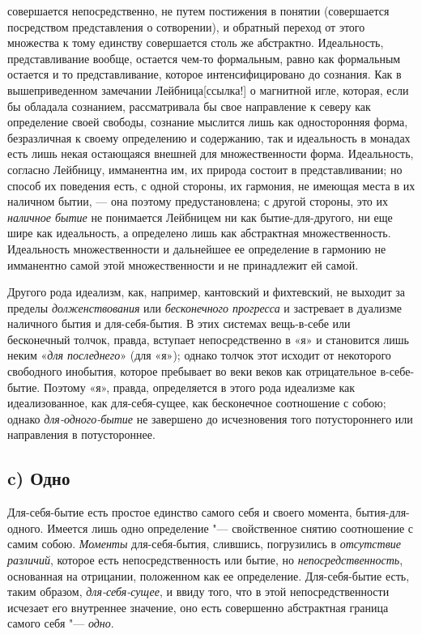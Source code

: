 совершается непосредственно, не путем постижения в понятии (совершается
посредством представления о сотворении), и обратный переход от этого
множества к тому единству совершается столь же абстрактно. Идеальность,
представливание вообще, остается чем-то формальным, равно как формальным
остается и то представливание, которое интенсифицировано до сознания. Как в
вышеприведенном замечании
Лейбница[ссылка!] о магнитной игле, которая, если
бы обладала сознанием, рассматривала бы свое направление к северу как
определение своей свободы, сознание мыслится лишь как односторонняя форма,
безразличная к своему определению и содержанию, так и идеальность в монадах
есть лишь некая остающаяся внешней для множественности форма. Идеальность,
согласно Лейбницу, имманентна им, их природа состоит в представливании; но
способ их поведения есть, с одной стороны, их гармония, не имеющая места в
их наличном бытии, — она поэтому предустановлена; с другой стороны, это их
{\em наличное бытие} не понимается Лейбницем ни как
бытие-для-другого, ни еще шире как идеальность, а определено лишь как
абстрактная множественность. Идеальность множественности и дальнейшее ее
определение в гармонию не имманентно самой этой множественности и не
принадлежит ей самой.

Другого рода идеализм, как, например, кантовский и фихтевский, не выходит за
пределы {\em долженствования} или
{\em бесконечного прогресса} и застревает в дуализме
наличного бытия и для-себя-бытия. В этих системах вещь-в-себе или
бесконечный толчок, правда, вступает непосредственно в «я» и становится
лишь неким «{\em для последнего}» (для «я»); однако
толчок этот исходит от некоторого свободного инобытия, которое пребывает во
веки веков как отрицательное в-себе-бытие. Поэтому «я», правда,
определяется в этого рода идеализме как идеализованное, как для-себя-сущее,
как бесконечное соотношение с собою; однако
{\em для-одного-бытие} не завершено до исчезновения
того потустороннего или направления в потустороннее.

\subsection*{c) Одно}
Для-себя-бытие есть простое единство самого себя и своего момента,
бытия-для-одного. Имеется лишь одно определение "--- свойственное снятию
соотношение с самим собою. {\em Моменты}
для-себя-бытия, слившись, погрузились в {\em отсутствие
различий}, которое есть непосредственность или бытие, но
{\em непосредственность}, основанная на отрицании,
положенном как ее определение. Для-себя-бытие есть, таким образом,
{\em для-себя-сущее}, и ввиду того, что в этой
непосредственности исчезает его внутреннее значение, оно есть совершенно
абстрактная граница самого себя "--- {\em одно}.

